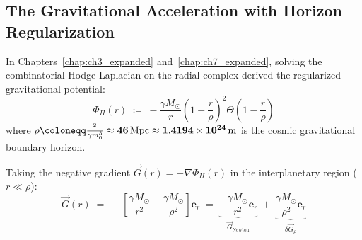 \documentclass[
    12pt,
    a4paper,
    headings=normal,
    twoside=false,
    open=any,
    parskip=half
]{scrbook}
\let\hbar\relax
\begin{document}
\subsection{The Gravitational Acceleration with Horizon Regularization}

In Chapters~\ref{chap:ch3_expanded} and~\ref{chap:ch7_expanded}, solving the combinatorial Hodge-Laplacian on the radial complex derived the regularized gravitational potential:
\begin{equation}
\Phi_H(r) \;\coloneqq\; -\frac{\gamma M_\odot}{r} \left( 1 - \frac{r}{\rho} \right)^2 \Theta\left( 1 - \frac{r}{\rho} \right)
\label{eq:appB_potential_def}
\end{equation}
where $\rho \coloneqq \frac{\hbar^2}{\gamma m_0^3} \approx \mathbf{46 \, \text{Mpc}} \approx \mathbf{1.4194 \times 10^{24} \, \text{m}}$ is the cosmic gravitational boundary horizon.

Taking the negative gradient $\vec{G}(r) = -\nabla \Phi_H(r)$ in the interplanetary region ($r \ll \rho$):
\begin{equation}
\vec{G}(r) \;=\; -\left[ \frac{\gamma M_\odot}{r^2} - \frac{\gamma M_\odot}{\rho^2} \right] \mathbf{e}_r \;=\; \underbrace{-\frac{\gamma M_\odot}{r^2}\mathbf{e}_r}_{\vec{G}_{\text{Newton}}} \;+\; \underbrace{\frac{\gamma M_\odot}{\rho^2}\mathbf{e}_r}_{\delta\vec{G}_\rho}
\label{eq:appB_acceleration_split}
\end{equation}
\end{document}
